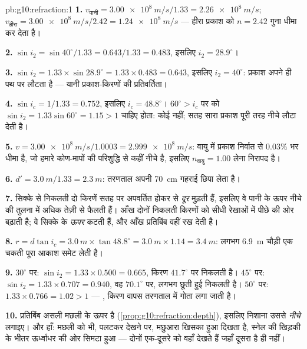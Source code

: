 \begin{solution}{pb:g10:refraction:1}
\textbf{1.} $v_{\text{पानी}} = \qty{3.00e8}{m/s}/1.33 =
\qty{2.26e8}{m/s}$; $v_{\text{हीरा}} = \qty{3.00e8}{m/s}/2.42 =
\qty{1.24e8}{m/s}$ --- हीरा प्रकाश को $n = 2.42$ गुना धीमा कर
देता है।

\textbf{2.} $\sin i_2 = \sin 40^\circ / 1.33 = 0.643/1.33 = 0.483$, इसलिए $i_2 = 28.9^\circ$।

\textbf{3.} $\sin i_2 = 1.33 \times \sin 28.9^\circ = 1.33 \times
0.483 = 0.643$, इसलिए $i_2 = 40^\circ$: प्रकाश अपने ही पथ पर लौटता है ---
यानी प्रकाश-किरणों की प्रतिवर्तिता।

\textbf{4.} $\sin i_c = 1/1.33 = 0.752$, इसलिए $i_c = 48.8^\circ$। $60^\circ > i_c$ पर 
को $\sin i_2 = 1.33 \sin
60^\circ = 1.15 > 1$ चाहिए होता: कोई  नहीं; सतह सारा
प्रकाश पूरी तरह नीचे लौटा देती है।

\textbf{5.} $v = \qty{3.00e8}{m/s}/1.0003 = \qty{2.999e8}{m/s}$: वायु में प्रकाश निर्वात से $0.03\%$ भर धीमा है, जो
हमारे कोण-मापों की परिशुद्धि से कहीं नीचे है, इसलिए $n_{\text{वायु}} = 1.00$ लेना
निरापद है।

\textbf{6.} $d' = \qty{3.0}{m}/1.33 = \qty{2.3}{m}$: तरणताल अपनी \qty{70}{cm} गहराई छिपा लेता है।

\textbf{7.} सिक्के से निकलती दो किरणें सतह पर अपवर्तित होकर
 से \emph{दूर} मुड़ती हैं, इसलिए वे पानी के ऊपर नीचे की
तुलना में अधिक तेज़ी से फैलती हैं। आँख दोनों निकलती किरणों को सीधी
रेखाओं में पीछे की ओर बढ़ाती है; वे सिक्के के \emph{ऊपर} कटती हैं, और
आँख प्रतिबिंब वहीं रख देती है।

\textbf{8.} $r = d \tan i_c = \qty{3.0}{m} \times \tan 48.8^\circ =
\qty{3.0}{m} \times 1.14 = \qty{3.4}{m}$: लगभग \qty{6.9}{m} चौड़ी एक चकती पूरा आकाश समेट लेती है।

\textbf{9.} $30^\circ$ पर: $\sin i_2 = 1.33 \times 0.500 = 0.665$, किरण $41.7^\circ$ पर निकलती है। $45^\circ$
पर: $\sin i_2 = 1.33 \times
0.707 = 0.940$, वह $70.1^\circ$ पर, लगभग छूती हुई निकलती है। $50^\circ$ पर:
$1.33 \times 0.766 = 1.02 > 1$ --- , किरण वापस तरणताल में गोता
लगा जाती है।

\textbf{10.} प्रतिबिंब असली मछली के ऊपर है (\cref{prop:g10:refraction:depth}), इसलिए निशाना उससे
\emph{नीचे} लगाइए। और हाँ: मछली को भी, पलटकर देखने पर, मछुआरा खिसका हुआ
दिखता है, स्नेल की खिड़की के भीतर ऊर्ध्वाधर की ओर सिमटा हुआ --- दोनों
एक-दूसरे को वहाँ देखते हैं जहाँ दूसरा है ही नहीं।


\end{solution}
